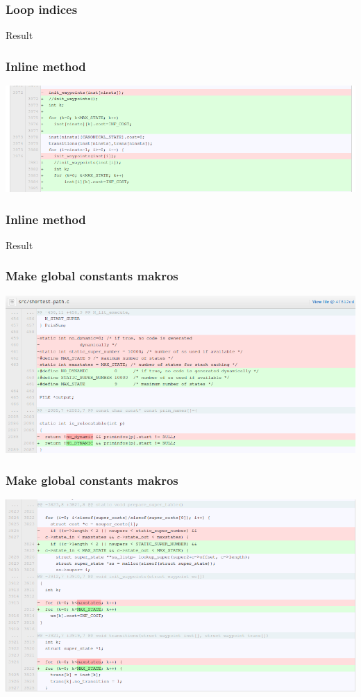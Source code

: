 \documentclass{beamer}
\begin{document}
\begin{frame}\frametitle{Loop indices}
\begin{center}
Result
\end{center}
\end{frame}

\begin{frame}\frametitle{Inline method}
\begin{center}
\includegraphics[scale=0.4]{shots/inline.png}
\end{center}
\end{frame}

\begin{frame}\frametitle{Inline method}
\begin{center}
Result
\end{center}
\end{frame}

\begin{frame}\frametitle{Make global constants makros}
\begin{center}
\includegraphics[scale=0.4]{shots/mgcm1.png}
\end{center}
\end{frame}

\begin{frame}\frametitle{Make global constants makros}
\begin{center}
\includegraphics[scale=0.4]{shots/mgcm2.png}
\end{center}
\end{frame}
\end{document}
